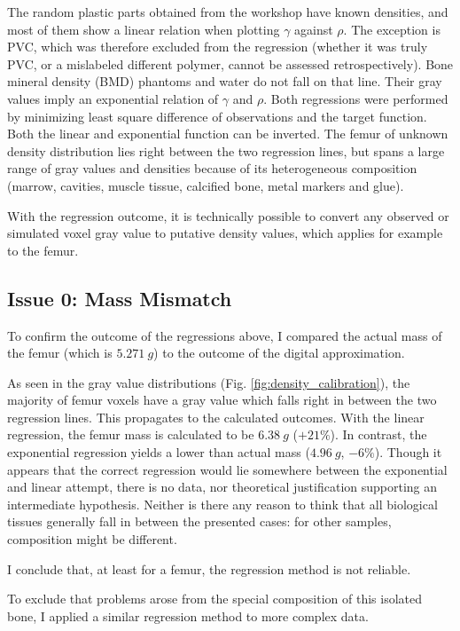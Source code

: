 The random plastic parts obtained from the workshop have known densities, and most of them show a linear relation when plotting \(\gamma\) against \(\rho\).
The exception is PVC, which was therefore excluded from the regression (whether it was truly PVC, or a mislabeled different polymer, cannot be assessed retrospectively).
Bone mineral density (BMD) phantoms and water do not fall on that line.
Their gray values imply an exponential relation of \(\gamma\) and \(\rho\).
Both regressions were performed by minimizing least square difference of observations and the target function.
Both the linear and exponential function can be inverted.
The femur of unknown density distribution lies right between the two regression lines, but spans a large range of gray values and densities because of its heterogeneous composition (marrow, cavities, muscle tissue, calcified bone, metal markers and glue).

With the regression outcome, it is technically possible to convert any observed or simulated voxel gray value to putative density values, which applies for example to the femur.
\subsection{Issue 0: Mass Mismatch}
\label{sec:orge4670a4}

To confirm the outcome of the regressions above, I compared the actual mass of the femur (which is \(5.271\ g\)) to the outcome of the digital approximation.

As seen in the gray value distributions (Fig. \ref{fig:density_calibration}), the majority of femur voxels have a gray value which falls right in between the two regression lines.
This propagates to the calculated outcomes.
With the linear regression, the femur mass is calculated to be \(6.38\ g\) (\(+21 \%\)).
In contrast, the exponential regression yields a lower than actual mass (\(4.96\ g\), \(-6 \%\)).
Though it appears that the correct regression would lie somewhere between the exponential and linear attempt, there is no data, nor theoretical justification supporting an intermediate hypothesis.
Neither is there any reason to think that all biological tissues generally fall in between the presented cases: for other samples, composition might be different.

I conclude that, at least for a femur, the regression method is not reliable.

\bigskip
To exclude that problems arose from the special composition of this isolated bone, I applied a similar regression method to more complex data.

